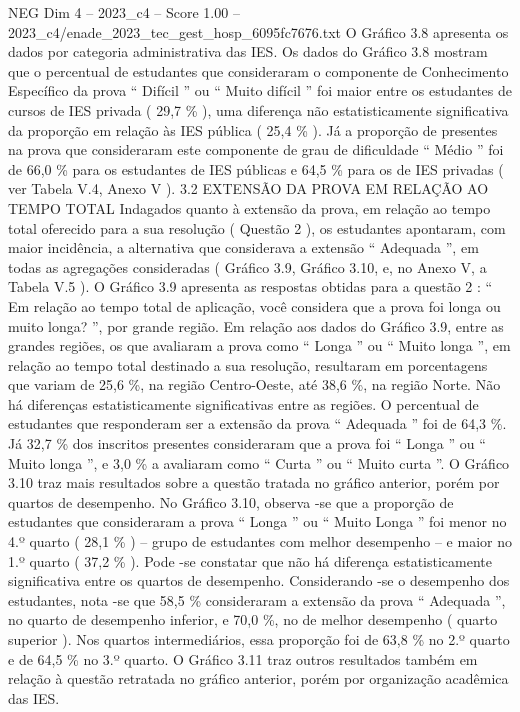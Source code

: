 \begin{textsample}{NEG Dim 4 – 2023\_c4 – Score 1.00 – 2023\_c4/enade\_2023\_tec\_gest\_hosp\_6095fc7676.txt}
O Gráfico 3.8 apresenta os dados por categoria administrativa das IES.
Os dados do Gráfico 3.8 mostram que o percentual de estudantes que consideraram o componente de Conhecimento Específico da prova “ Difícil ” ou “ Muito difícil ” foi maior entre os estudantes de cursos de IES privada ( 29,7 \% ), uma diferença não estatisticamente significativa da proporção em relação às IES pública ( 25,4 \% ).
Já a proporção de presentes na prova que consideraram este componente de grau de dificuldade “ Médio ” foi de 66,0 \% para os estudantes de IES públicas e 64,5 \% para os de IES privadas ( ver Tabela V.4, Anexo V ). 3.2 EXTENSÃO DA PROVA EM RELAÇÃO AO TEMPO TOTAL Indagados quanto à extensão da prova, em relação ao tempo total oferecido para a sua resolução ( Questão 2 ), os estudantes apontaram, com maior incidência, a alternativa que considerava a extensão “ Adequada ”, em todas as agregações consideradas ( Gráfico 3.9, Gráfico 3.10, e, no Anexo V, a Tabela V.5 ).
O Gráfico 3.9 apresenta as respostas obtidas para a questão 2 : “ Em relação ao tempo total de aplicação, você considera que a prova foi longa ou muito longa? ”, por grande região.
Em relação aos dados do Gráfico 3.9, entre as grandes regiões, os que avaliaram a prova como “ Longa ” ou “ Muito longa ”, em relação ao tempo total destinado a sua resolução, resultaram em porcentagens que variam de 25,6 \%, na região Centro-Oeste, até 38,6 \%, na região Norte.
Não há diferenças estatisticamente significativas entre as regiões.
O percentual de estudantes que responderam ser a extensão da prova “ Adequada ” foi de 64,3 \%.
Já 32,7 \% dos inscritos presentes consideraram que a prova foi “ Longa ” ou “ Muito longa ”, e 3,0 \% a avaliaram como “ Curta ” ou “ Muito curta ”.
O Gráfico 3.10 traz mais resultados sobre a questão tratada no gráfico anterior, porém por quartos de desempenho.
No Gráfico 3.10, observa -se que a proporção de estudantes que consideraram a prova “ Longa ” ou “ Muito Longa ” foi menor no 4.º quarto ( 28,1 \% ) – grupo de estudantes com melhor desempenho – e maior no 1.º quarto ( 37,2 \% ).
Pode -se constatar que não há diferença estatisticamente significativa entre os quartos de desempenho.
Considerando -se o desempenho dos estudantes, nota -se que 58,5 \% consideraram a extensão da prova “ Adequada ”, no quarto de desempenho inferior, e 70,0 \%, no de melhor desempenho ( quarto superior ).
Nos quartos intermediários, essa proporção foi de 63,8 \% no 2.º quarto e de 64,5 \% no 3.º quarto.
O Gráfico 3.11 traz outros resultados também em relação à questão retratada no gráfico anterior, porém por organização acadêmica das IES.

\end{textsample}
